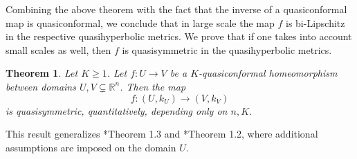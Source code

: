 \documentclass[letterpaper]{amsart}
\theoremstyle{plain}
\newtheorem{theorem}{Theorem}
\theoremstyle{definition}
\theoremstyle{remark}
\numberwithin{equation}{section}
\numberwithin{theorem}{section}
\newcommand{\R}{\mathbb R}
\begin{document}
Combining the above theorem with the fact that the inverse of a quasiconformal map is quasiconformal, we conclude that in large scale the map $f$ is bi-Lipschitz in the respective quasihyperbolic metrics. We prove that if one takes into account small scales as well, then $f$ is quasisymmetric in the quasihyperbolic metrics. 

\begin{theorem}\label{theorem:qc_qs_qh}
Let $K\geq 1$. Let $f\colon U\to V$ be a $K$-quasi\-con\-for\-mal homeomorphism between domains $U,V\subsetneq \R^n$. Then the map
$$f\colon (U,k_U)\to (V,k_V)$$
is quasisymmetric, quantitatively, depending only on $n,K$.
\end{theorem}

This result generalizes \cite{AckermanFletcher:qc_qs}*{Theorem 1.3} and \cite{FletcherHahn:uqc_homogeneous}*{Theorem 1.2}, where additional assumptions are imposed on the domain $U$.
\end{document}
